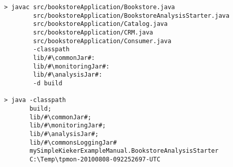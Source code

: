 \begin{lstlisting}[caption=Compile and run under Windows] 			
> javac src/bookstoreApplication/Bookstore.java 
        src/bookstoreApplication/BookstoreAnalysisStarter.java 
        src/bookstoreApplication/Catalog.java 
        src/bookstoreApplication/CRM.java 
        src/bookstoreApplication/Consumer.java
        -classpath
        lib/#\commonJar#:
        lib/#\monitoringJar#:
        lib/#\analysisJar#:
        -d build

> java -classpath 
       build;
       lib/#\commonJar#;
       lib/#\monitoringJar#;
       lib/#\analysisJar#;
       lib/#\commonsLoggingJar#
       mySimpleKiekerExampleManual.BookstoreAnalysisStarter 
       C:\Temp\tpmon-20100808-092252697-UTC
\end{lstlisting}	
